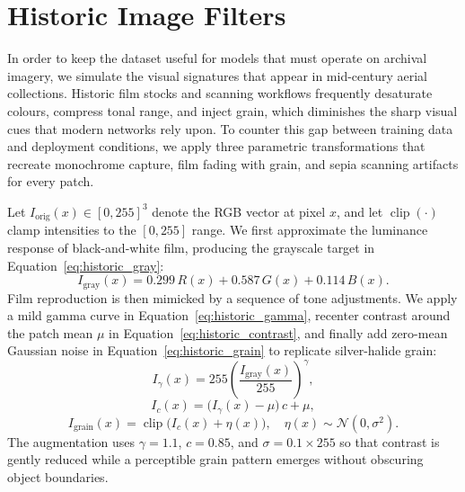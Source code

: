 \section{Historic Image Filters}
\label{subsec:historic_filters}

In order to keep the dataset useful for models that must operate on archival imagery, we simulate the visual signatures that appear in mid-century aerial collections. Historic film stocks and scanning workflows frequently desaturate colours, compress tonal range, and inject grain, which diminishes the sharp visual cues that modern networks rely upon. To counter this gap between training data and deployment conditions, we apply three parametric transformations that recreate monochrome capture, film fading with grain, and sepia scanning artifacts for every patch.

Let $I_{\text{orig}}(x) \in [0,255]^3$ denote the RGB vector at pixel $x$, and let $\operatorname{clip}(\cdot)$ clamp intensities to the $[0,255]$ range. We first approximate the luminance response of black-and-white film, producing the grayscale target in Equation~\ref{eq:historic_gray}:
\begin{equation}
I_{\text{gray}}(x) = 0.299\,R(x) + 0.587\,G(x) + 0.114\,B(x).
\label{eq:historic_gray}
\end{equation}
Film reproduction is then mimicked by a sequence of tone adjustments. We apply a mild gamma curve in Equation~\ref{eq:historic_gamma}, recenter contrast around the patch mean $\mu$ in Equation~\ref{eq:historic_contrast}, and finally add zero-mean Gaussian noise in Equation~\ref{eq:historic_grain} to replicate silver-halide grain:
\begin{equation}
I_{\gamma}(x) = 255\left( \frac{I_{\text{gray}}(x)}{255} \right)^{\gamma},
\label{eq:historic_gamma}
\end{equation}
\begin{equation}
I_{c}(x) = \big(I_{\gamma}(x) - \mu\big)\,c + \mu,
\label{eq:historic_contrast}
\end{equation}
\begin{equation}
I_{\text{grain}}(x) = \operatorname{clip}\big(I_{c}(x) + \eta(x)\big), \quad \eta(x) \sim \mathcal{N}(0, \sigma^2).
\label{eq:historic_grain}
\end{equation}
The augmentation uses $\gamma = 1.1$, $c = 0.85$, and $\sigma = 0.1\times 255$ so that contrast is gently reduced while a perceptible grain pattern emerges without obscuring object boundaries.

